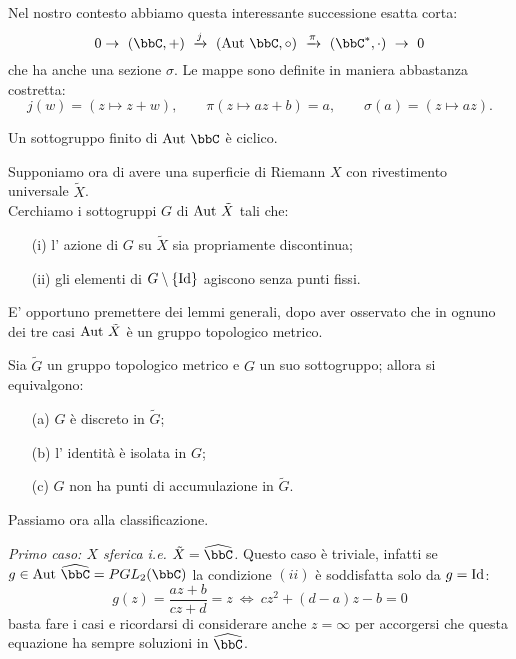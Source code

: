 Nel nostro contesto abbiamo questa interessante successione esatta corta:
$$
0\rightarrow\ (\bbC,+)\ \xrightarrow{j}\ (\Aut{\bbC},\circ)\ \xrightarrow{\pi}\ (\bbC^*,\cdot)\  \rightarrow\ 0
$$
che ha anche una sezione $\sigma$. Le mappe sono definite in maniera abbastanza costretta:
$$
j(w)=(z\mapsto z+w),\qquad \pi(z\mapsto az+b)=a,\qquad \sigma(a)=(z\mapsto az).
$$
\begin{esercizio}
Un sottogruppo finito di $\Aut{\bbC}$ è ciclico.
\end{esercizio}
Supponiamo ora di avere una superficie di Riemann $X$ con rivestimento universale $\tilde X$.\\ 
Cerchiamo i sottogruppi $G$ di $\text{Aut }{\tilde{X}}$ tali che:
\begin{itemize}
\item[(i)] l' azione di $G$ su $\tilde{X}$ sia propriamente discontinua;
\item[(ii)] gli elementi di $G\setminus\{\text{Id}\}$ agiscono senza punti fissi.
\end{itemize}
E' opportuno premettere dei lemmi generali, dopo aver osservato che in ognuno dei tre casi $\text{Aut }{\tilde{X}}$ è un gruppo topologico metrico.
\begin{lemma}Sia $\tilde G$ un gruppo topologico metrico e $G$ un suo sottogruppo; allora si equivalgono:
\begin{itemize}
\item[(a)] $G$ è discreto in $\tilde G$;
\item[(b)] l' identità è isolata in $G$;
\item[(c)] $G$ non ha punti di accumulazione in $\tilde G$.
\end{itemize}
\end{lemma}

Passiamo ora alla classificazione.

{\it Primo caso: $X$ sferica i.e. $\tilde {X}=\hat{\bbC}$.} Questo caso è triviale, infatti se $g\in\Aut{\hat{\bbC}}=PGL_2(\bbC)$ la condizione $(ii)$ è soddisfatta solo da $g=\text{Id}$:
$$
g(z)=\frac{az+b}{cz+d}=z\ \Leftrightarrow\ cz^2+(d-a)z-b=0
$$
basta fare i casi e ricordarsi di considerare anche $z=\infty$ per accorgersi che questa equazione ha sempre soluzioni in $\hat{\bbC}$.

